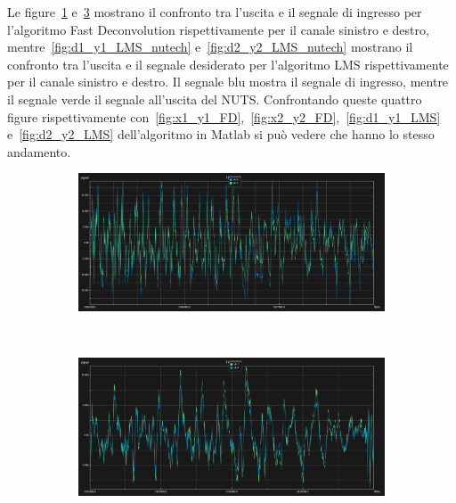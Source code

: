 \documentclass[12pt,a4paper,titlepage]{article}
\begin{document}
Le figure~\ref{fig:x1_y1_FD_nutech} e~\ref{fig:x2_y2_FD_nutech} mostrano il confronto tra l'uscita e il segnale di ingresso per l'algoritmo Fast Deconvolution rispettivamente per il canale sinistro e destro, mentre~\ref{fig:d1_y1_LMS_nutech} e~\ref{fig:d2_y2_LMS_nutech} mostrano il confronto tra l'uscita e il segnale desiderato per l'algoritmo LMS rispettivamente per il canale sinistro e destro. Il segnale blu mostra il segnale di ingresso, mentre il segnale verde il segnale all'uscita del NUTS. Confrontando queste quattro figure rispettivamente con~\ref{fig:x1_y1_FD},~\ref{fig:x2_y2_FD},~\ref{fig:d1_y1_LMS} e~\ref{fig:d2_y2_LMS} dell'algoritmo in Matlab si può vedere che hanno lo stesso andamento.
\begin{figure}[h]
	\centering
	\begin{subfigure}{1\textwidth}
		\includegraphics[width=1\textwidth]{Immagini/x1_y1_FD_nutech}
		\caption{}
		\label{fig:x1_y1_FD_nutech}
	\end{subfigure}\\
	\begin{subfigure}{1\textwidth}
			\includegraphics[width=1\textwidth]{Immagini/x2_y2_FD_nutech}
			\caption{}
			\label{fig:x2_y2_FD_nutech}
	\end{subfigure}
\end{figure}
\end{document}
